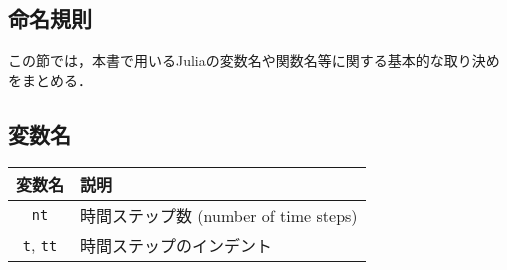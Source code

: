 \documentclass[titlepage]{ltjsbook}
\newcommand{\jl}{\lstinline[language=julia]}
\begin{document}
\subsection{命名規則}
この節では，本書で用いるJuliaの変数名や関数名等に関する基本的な取り決めをまとめる．

\subsection{変数名}
\begin{tabular}{cl} \hline
  変数名 & 説明\\\hline
   \jl{nt} & 時間ステップ数 (number of time steps)\\
   \jl{t}, \jl{tt} & 時間ステップのインデント\\\hline
\end{tabular}

\printbibliography[segment=\therefsegment,heading=subbibliography,title={参考文献}]
\end{document}
